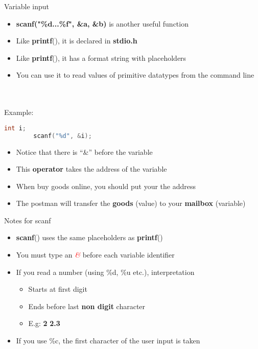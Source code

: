 \begin{frame}[fragile]{Variable input}
	\begin{itemize}
		\item {\textbf{scanf("\%d...\%f", \&a, \&b)} is another useful function}
		\item {Like \textbf{printf}(), it is declared in \textbf{stdio.h}}
		\item {Like \textbf{printf}(), it has a format string with placeholders}
		\item You can use it to read values of primitive datatypes from the command line
	\end{itemize}
	\ \\ \ \\ Example:
	\begin{lstlisting}[numbers=none, language=c, frame=none]
		int i;
		scanf("%d", &i);	
	\end{lstlisting}
	\begin{itemize}
		\item {Notice that there is ``\&'' before the variable}
		\item {This \textbf{operator} takes the address of the variable}
		\item {When buy goods online, you should put your the address}
		\item {The postman will transfer the \textbf{goods} (value) to your \textbf{mailbox} (variable)}
	\end{itemize}
\end{frame}

\begin{frame}{Notes for scanf}
	\begin{itemize}
		\item {\textbf{scanf}() uses the same placeholders as \textbf{printf}()}
		\item {You must type an \textcolor{red}{\textit{\&}} before each variable identifier}
		\item {If you read a number (using \%d, \%u etc.), interpretation}
		\begin{itemize}
			\item {Starts at first digit}
			\item {Ends before last \textbf{non digit} character}
			\item {E.g: \textbf{2} \textbf{2.3}}
		\end{itemize}
		\item {If you use \%c, the first character of the user input is taken}
	\end{itemize}
\end{frame}


